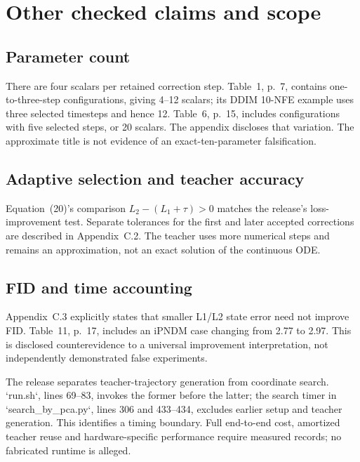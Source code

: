 \documentclass[10pt]{article}
\begin{document}
\section*{Other checked claims and scope}
\subsection*{Parameter count}
There are four scalars per retained correction step. Table 1, p. 7, contains one-to-three-step configurations, giving 4–12 scalars; its DDIM 10-NFE example uses three selected timesteps and hence 12. Table 6, p. 15, includes configurations with five selected steps, or 20 scalars. The appendix discloses that variation. The approximate title is not evidence of an exact-ten-parameter falsification.\par
\subsection*{Adaptive selection and teacher accuracy}
Equation (20)’s comparison \(L_2-(L_1+\tau)>0\) matches the release’s loss-improvement test. Separate tolerances for the first and later accepted corrections are described in Appendix C.2. The teacher uses more numerical steps and remains an approximation, not an exact solution of the continuous ODE.\par
\subsection*{FID and time accounting}
Appendix C.3 explicitly states that smaller L1/L2 state error need not improve FID. Table 11, p. 17, includes an iPNDM case changing from 2.77 to 2.97. This is disclosed counterevidence to a universal improvement interpretation, not independently demonstrated false experiments.\par
The release separates teacher-trajectory generation from coordinate search. `run.sh`, lines 69–83, invokes the former before the latter; the search timer in `search\_by\_pca.py`, lines 306 and 433–434, excludes earlier setup and teacher generation. This identifies a timing boundary. Full end-to-end cost, amortized teacher reuse and hardware-specific performance require measured records; no fabricated runtime is alleged.\par
\end{document}
